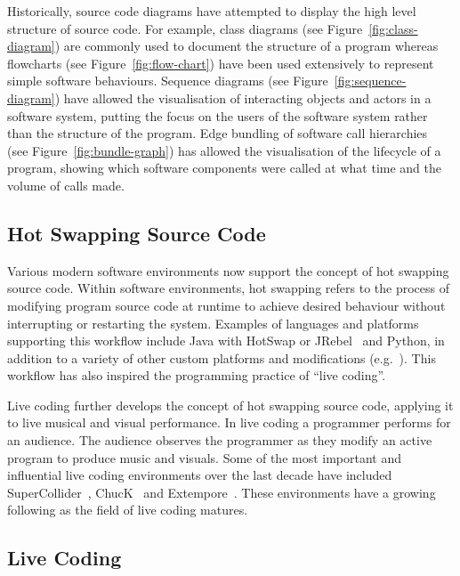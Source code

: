 Historically, source code diagrams have attempted to display the high level structure of source code. For example, class diagrams (see Figure~\ref{fig:class-diagram}) are commonly used to document the structure of a program whereas flowcharts (see Figure~\ref{fig:flow-chart}) have been used extensively to represent simple software behaviours. Sequence diagrams (see Figure~\ref{fig:sequence-diagram}) have allowed the visualisation of interacting objects and actors in a software system, putting the focus on the users of the software system rather than the structure of the program. Edge bundling of software call hierarchies~\cite{Holten2006,Zhou2013} (see Figure~\ref{fig:bundle-graph}) has allowed the visualisation of the lifecycle of a program, showing which software components were called at what time and the volume of calls made.

\subsection{Hot Swapping Source Code}

Various modern software environments now support the concept of hot swapping source code. Within software environments, hot swapping refers to the process of modifying program source code at runtime to achieve desired behaviour without interrupting or restarting the system. Examples of languages and platforms supporting this workflow include Java with HotSwap or JRebel~\cite{ZeroTurnaround2014} and Python, in addition to a variety of other custom platforms and modifications (e.g.~\cite{Thomas2011}). This workflow has also inspired the programming practice of ``live coding''. 

Live coding further develops the concept of hot swapping source code, applying it to live musical and visual performance. In live coding a programmer performs for an audience. The audience observes the programmer as they modify an active program to produce music and visuals. Some of the most important and influential live coding environments over the last decade have included SuperCollider~\cite{McCartney}, ChucK~\cite{Wang2008} and Extempore~\cite{Sorensen}. These environments have a growing following as the field of live coding matures.

\subsection{Live Coding}

